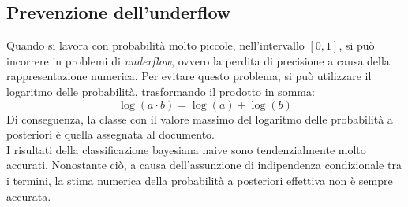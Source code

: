 \documentclass{report}
\begin{document}
	\subsection{Prevenzione dell'underflow}
	Quando si lavora con probabilità molto piccole, nell'intervallo $[0,1]$, si può incorrere in problemi di \textit{underflow}, ovvero la perdita di precisione a causa della rappresentazione numerica. Per evitare questo problema, si può utilizzare il logaritmo delle probabilità, trasformando il prodotto in somma:
	\[
		\log(a \cdot b) = \log(a) + \log(b)
	\]
	Di conseguenza, la classe con il valore massimo del logaritmo delle probabilità a posteriori è quella assegnata al documento.
	\vspace{\baselineskip}\\
	I risultati della classificazione bayesiana naive sono tendenzialmente molto accurati. Nonostante ciò, a causa dell'assunzione di indipendenza condizionale tra i termini, la stima numerica della probabilità a posteriori effettiva non è sempre accurata.
\end{document}
